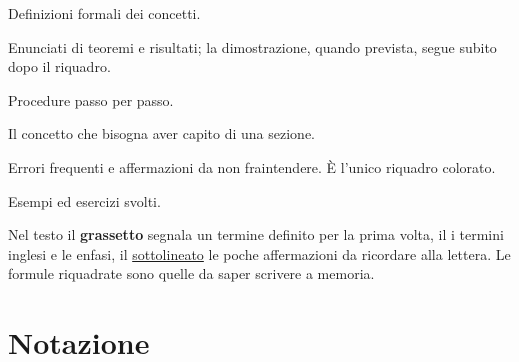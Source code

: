\begin{definizione}[nome]
Definizioni formali dei concetti.
\end{definizione}
\begin{teorema}[nome]
Enunciati di teoremi e risultati; la dimostrazione, quando prevista, segue subito dopo il riquadro.
\end{teorema}
\begin{algoritmo}[nome]
Procedure passo per passo.
\end{algoritmo}
\begin{idea}
Il concetto che bisogna aver capito di una sezione.
\end{idea}
\begin{attenzione}
Errori frequenti e affermazioni da non fraintendere. È l'unico riquadro colorato.
\end{attenzione}
\begin{esempio}
Esempi ed esercizi svolti.
\end{esempio}

Nel testo il \textbf{grassetto} segnala un termine definito per la prima volta, il  i termini
inglesi e le enfasi, il \uline{sottolineato} le poche affermazioni da ricordare alla lettera. Le formule
riquadrate sono quelle da saper scrivere a memoria.

\section*{Notazione}

